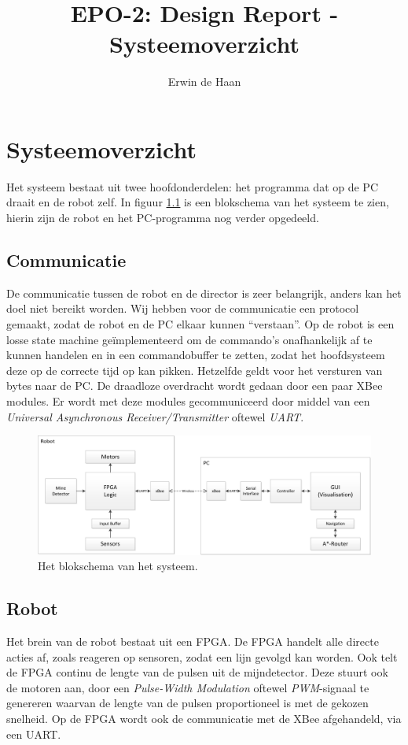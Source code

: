 \documentclass{report}
\title{EPO-2: Design Report - Systeemoverzicht}
\author{Erwin de Haan}
\begin{document}
\chapter{Systeemoverzicht}
\label{ch:systeem}
Het systeem bestaat uit twee hoofdonderdelen: het programma dat op de PC draait en de robot zelf.
In figuur \ref{fig:topLevelSystem} is een blokschema van het systeem te zien, hierin zijn de robot en het PC-programma nog verder opgedeeld. 
\section{Communicatie}
De communicatie tussen de robot en de director is zeer belangrijk, anders kan het doel niet bereikt worden.
Wij hebben voor de communicatie een protocol gemaakt, zodat de robot en de PC elkaar kunnen ``verstaan''.
Op de robot is een losse state machine geïmplementeerd om de commando's onafhankelijk af te kunnen handelen en in een commandobuffer te zetten, zodat het hoofdsysteem deze op de correcte tijd op kan pikken.
Hetzelfde geldt voor het versturen van bytes naar de PC.
De draadloze overdracht wordt gedaan door een paar XBee modules.
Er wordt met deze modules gecommuniceerd door middel van een \textit{Universal Asynchronous Receiver/Transmitter} oftewel \textit{UART}.

\begin{figure}
	\centering
	\caption{Het blokschema van het systeem.}
	\label{fig:topLevelSystem}
	\includegraphics[width=\textwidth]{top-level-system}
\end{figure}

\section{Robot}
Het brein van de robot bestaat uit een FPGA.
De FPGA handelt alle directe acties af, zoals reageren op sensoren, zodat een lijn gevolgd kan worden.
Ook telt de FPGA continu de lengte van de pulsen uit de mijndetector.
Deze stuurt ook de motoren aan, door een \textit{Pulse-Width Modulation} oftewel \textit{PWM}-signaal te genereren waarvan de lengte van de pulsen proportioneel is met de gekozen snelheid.
Op de FPGA wordt ook de communicatie met de XBee afgehandeld, via een UART.
\end{document}
